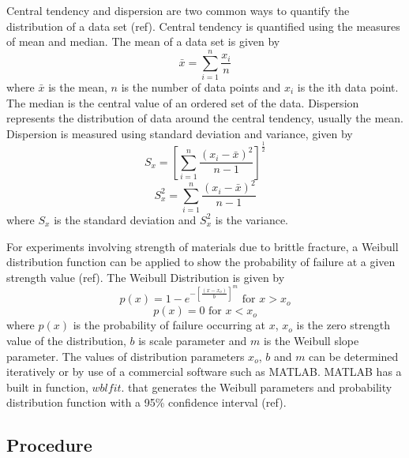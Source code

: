 \documentclass[12pt]{article}
\begin{document}
Central tendency and dispersion are two common ways to quantify the distribution of a data set (ref). Central tendency is quantified using the measures of mean and median. The mean of a data set is given by
\begin{equation}
\bar{x} = \sum_{i=1}^{n}\frac{x_{i}}{n}
\end{equation}
where $\bar{x}$ is the mean, $n$ is the number of data points and $x_{i}$ is the ith data point. The median is the central value of an ordered set of the data. Dispersion represents the distribution of data around the central tendency, usually the mean. Dispersion is measured using standard deviation and variance, given by 
\begin{equation}
S_{x} = \left[\sum_{i=1}^{n}\frac{\left(x_{i}-\bar{x}\right)^2}{n-1}\right]^\frac{1}{2}
\end{equation}  
\begin{equation}
S_{x}^2 = \sum_{i=1}^{n}\frac{\left(x_{i}-\bar{x}\right)^2}{n-1}
\end{equation} 
where $S_{x}$ is the standard deviation and $S_{x}^2$ is the variance.

For experiments involving strength of materials due to brittle fracture, a Weibull distribution function can be applied to show the probability of failure at a given strength value (ref). The Weibull Distribution is given by
\begin{equation}
p(x) = 1-e^{-\left[\frac{\left(x-x_{o}\right)}{b}\right]^m} \text{ for } x > x_{o}
\end{equation}
\begin{equation}
p(x) = 0  \text { for } x < x_{o}
\end{equation} 
where $p(x)$ is the probability of failure occurring at $x$, $x_{o}$ is the zero strength value of the distribution, $b$ is scale parameter and $m$ is the Weibull slope parameter. The values of distribution parameters $x_{o}$, $b$ and $m$ can be determined iteratively or by use of a commercial software such as MATLAB. MATLAB has a built in function, $wblfit$. that generates the Weibull parameters and probability distribution function with a 95\% confidence interval (ref).

\subsection{Procedure} %
\end{document}
